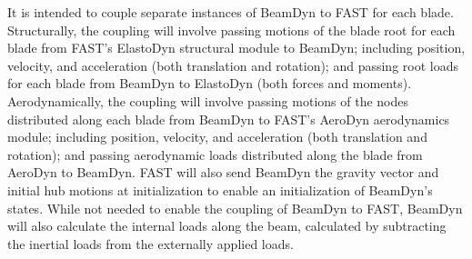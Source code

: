 \documentclass{aiaa-tc}
\begin{document}
It is intended to couple separate instances of BeamDyn to FAST for each blade.  Structurally, the coupling will involve passing motions of the blade root for each blade from FAST's ElastoDyn structural module to BeamDyn; including position, velocity, and acceleration (both translation and rotation); and passing root loads for each blade from BeamDyn to ElastoDyn (both forces and moments).  Aerodynamically, the coupling will involve passing motions of the nodes distributed along each blade from BeamDyn to FAST's AeroDyn aerodynamics module; including position, velocity, and acceleration (both translation and rotation); and passing aerodynamic loads distributed along the blade from AeroDyn to BeamDyn.  FAST will also send BeamDyn the gravity vector and initial hub motions at initialization to enable an initialization of BeamDyn's states.  While not needed to enable the coupling of BeamDyn to FAST, BeamDyn will also calculate the internal loads along the beam, calculated by subtracting the inertial loads from the externally applied loads.
\end{document}
